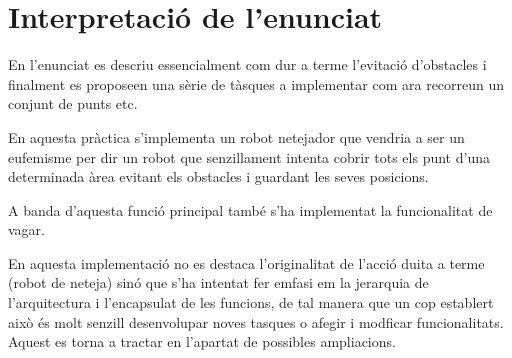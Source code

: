 \section{Interpretació de l'enunciat}

En l'enunciat es descriu essencialment com dur a terme l'evitació d'obstacles i finalment
es proposeen una sèrie de tàsques a implementar com ara recorreun un conjunt de punts etc.

En aquesta pràctica s'implementa un robot netejador que vendria a ser un eufemisme per dir un
robot que senzillament intenta cobrir tots els punt d'una determinada àrea evitant els obstacles
i guardant les seves posicions.

A banda d'aquesta funció principal també s'ha implementat la funcionalitat de vagar.

En aquesta implementació no es destaca l'originalitat de l'acció duita a terme (robot de neteja)
sinó que s'ha intentat fer emfasi em la jerarquia de l'arquitectura i l'encapsulat de les funcions, de tal
manera que un cop establert això és molt senzill desenvolupar noves tasques o afegir i modficar
funcionalitats. Aquest es torna a tractar en l'apartat de possibles ampliacions.